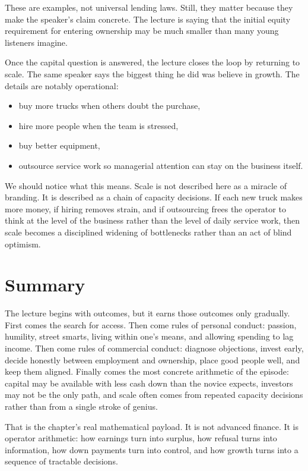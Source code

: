 These are examples, not universal lending laws. Still, they matter because they make the speaker's claim concrete. The lecture is saying that the initial equity requirement for entering ownership may be much smaller than many young listeners imagine.

Once the capital question is answered, the lecture closes the loop by returning to scale. The same speaker says the biggest thing he did was believe in growth. The details are notably operational:
\begin{itemize}
\item buy more trucks when others doubt the purchase,
\item hire more people when the team is stressed,
\item buy better equipment,
\item outsource service work so managerial attention can stay on the business itself.
\end{itemize}

We should notice what this means. Scale is not described here as a miracle of branding. It is described as a chain of capacity decisions. If each new truck makes more money, if hiring removes strain, and if outsourcing frees the operator to think at the level of the business rather than the level of daily service work, then scale becomes a disciplined widening of bottlenecks rather than an act of blind optimism.

\section{Summary}

The lecture begins with outcomes, but it earns those outcomes only gradually. First comes the search for access. Then come rules of personal conduct: passion, humility, street smarts, living within one's means, and allowing spending to lag income. Then come rules of commercial conduct: diagnose objections, invest early, decide honestly between employment and ownership, place good people well, and keep them aligned. Finally comes the most concrete arithmetic of the episode: capital may be available with less cash down than the novice expects, investors may not be the only path, and scale often comes from repeated capacity decisions rather than from a single stroke of genius.

That is the chapter's real mathematical payload. It is not advanced finance. It is operator arithmetic: how earnings turn into surplus, how refusal turns into information, how down payments turn into control, and how growth turns into a sequence of tractable decisions.